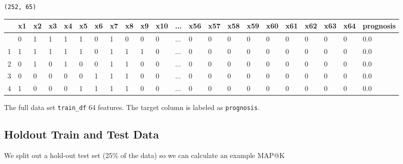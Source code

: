 \documentclass[
  letterpaper,
  DIV=11,
  numbers=noendperiod]{scrreprt}
\begin{document}
\begin{verbatim}
(252, 65)
\end{verbatim}

\begin{longtable}[]{@{}llllllllllllllllllllll@{}}
\toprule\noalign{}
& x1 & x2 & x3 & x4 & x5 & x6 & x7 & x8 & x9 & x10 & ... & x56 & x57 &
x58 & x59 & x60 & x61 & x62 & x63 & x64 & prognosis \\
\midrule\noalign{}
\endhead
\bottomrule\noalign{}
\endlastfoot
0 & 0 & 1 & 1 & 1 & 1 & 0 & 1 & 0 & 0 & 0 & ... & 0 & 0 & 0 & 0 & 0 & 0
& 0 & 0 & 0 & 0.0 \\
1 & 1 & 1 & 1 & 1 & 1 & 0 & 1 & 1 & 1 & 0 & ... & 0 & 0 & 0 & 0 & 0 & 0
& 0 & 0 & 0 & 0.0 \\
2 & 0 & 1 & 0 & 1 & 0 & 0 & 1 & 1 & 0 & 0 & ... & 0 & 0 & 0 & 0 & 0 & 0
& 0 & 0 & 0 & 0.0 \\
3 & 0 & 0 & 0 & 0 & 0 & 1 & 1 & 1 & 0 & 0 & ... & 0 & 0 & 0 & 0 & 0 & 0
& 0 & 0 & 0 & 0.0 \\
4 & 1 & 0 & 0 & 0 & 1 & 1 & 1 & 1 & 0 & 0 & ... & 0 & 0 & 0 & 0 & 0 & 0
& 0 & 0 & 0 & 0.0 \\
\end{longtable}

The full data set \texttt{train\_df} 64 features. The target column is
labeled as \texttt{prognosis}.

\hypertarget{holdout-train-and-test-data-3}{%
\subsection{Holdout Train and Test
Data}\label{holdout-train-and-test-data-3}}

We split out a hold-out test set (25\% of the data) so we can calculate
an example MAP@K
\end{document}
